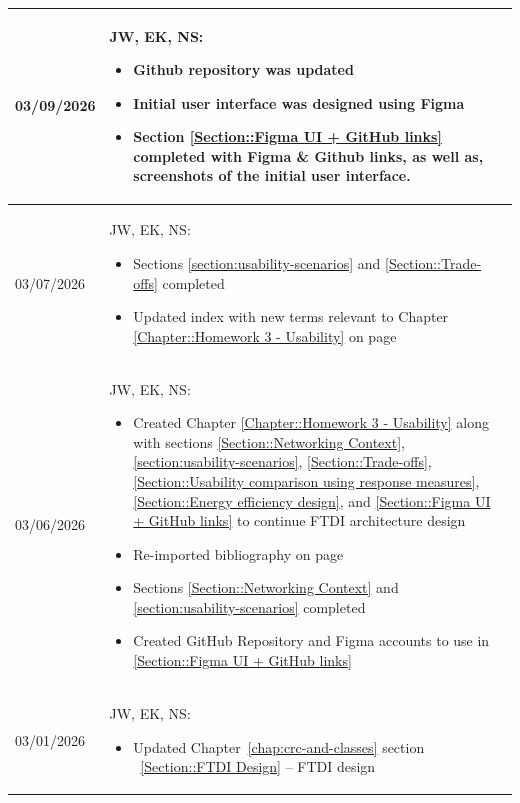 \begin{longtable}{|l||p{13.5cm}|}
03/09/2026 & 
JW, EK, NS:
\begin{itemize}[topsep=0pt,itemsep=0pt,parsep=0pt,partopsep=0pt,leftmargin=12pt]
\item Github repository was updated
\item Initial user interface was designed using Figma
\item Section \ref{Section::Figma UI + GitHub links} completed with Figma \& Github links, as well as, screenshots of the initial user interface.
\end{itemize}
\\ \hline

03/07/2026 & 
JW, EK, NS:
\begin{itemize}[topsep=0pt,itemsep=0pt,parsep=0pt,partopsep=0pt,leftmargin=12pt]
\item Sections \ref{section:usability-scenarios} and \ref{Section::Trade-offs} completed
\item Updated index with new terms relevant to Chapter \ref{Chapter::Homework 3 - Usability} on page~\pageref{chap:index}
\end{itemize}
\\ \hline

03/06/2026 & 
JW, EK, NS:
\begin{itemize}[topsep=0pt,itemsep=0pt,parsep=0pt,partopsep=0pt,leftmargin=12pt]
\item Created Chapter \ref{Chapter::Homework 3 - Usability} along with sections \ref{Section::Networking Context}, \ref{section:usability-scenarios}, \ref{Section::Trade-offs}, \ref{Section::Usability comparison using response measures}, \ref{Section::Energy efficiency design}, and \ref{Section::Figma UI + GitHub links} to continue FTDI architecture design
\item Re-imported bibliography on page~\pageref{chap:bibliography}
\item Sections \ref{Section::Networking Context} and \ref{section:usability-scenarios} completed
\item Created GitHub Repository and Figma accounts to use in \ref{Section::Figma UI + GitHub links}
\end{itemize}
\\ \hline

03/01/2026 & 
JW, EK, NS:
\begin{itemize}[topsep=0pt,itemsep=0pt,parsep=0pt,partopsep=0pt,leftmargin=12pt]
\item Updated Chapter~\ref{chap:crc-and-classes} section ~\ref{Section::FTDI Design} --  FTDI design
\end{itemize}
\\ \hline


\end{longtable}
